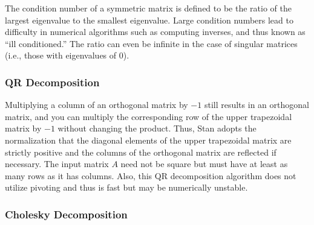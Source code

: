 The condition number of a symmetric matrix is defined to be the ratio
of the largest eigenvalue to the smallest eigenvalue.  Large condition
numbers lead to difficulty in numerical algorithms such as computing
inverses, and thus known as ``ill conditioned.''  The ratio can even
be infinite in the case of singular matrices (i.e., those with
eigenvalues of 0).

%
%
%

\subsubsection{QR Decomposition}

\begin{description}
%
%
%
\end{description}
%
Multiplying a column of an orthogonal matrix by $-1$ still results in 
an orthogonal matrix, and you can multiply the corresponding row of 
the upper trapezoidal matrix by $-1$ without changing the product. Thus,
Stan adopts the normalization that the diagonal elements of the upper
trapezoidal matrix are strictly positive and the columns of the 
orthogonal matrix are reflected if necessary. The input matrix $A$ need
not be square but must have at least as many rows as it has columns.
Also, this QR decomposition algorithm does not utilize pivoting and 
thus is fast but may be numerically unstable.

\subsubsection{Cholesky Decomposition}

